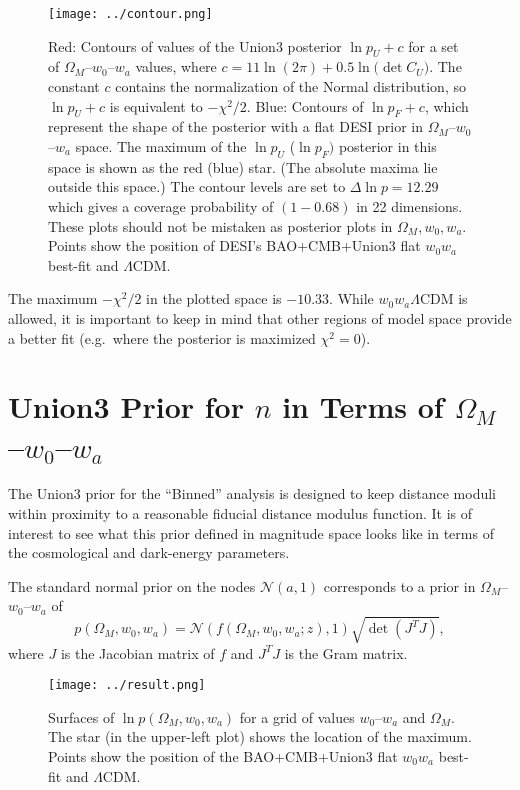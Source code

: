 \documentclass[11pt,a4paper]{article}
\begin{document}
\begin{figure}[htbp] %
   \centering
   \texttt{[image: ../contour.png]} 
   \caption{Red: Contours of values of the Union3 posterior $\ln{p_U}+c$ for a
set of $\Omega_M$--$w_0$--$w_a$ values, where $c= 11\ln{(2\pi)} + 0.5\ln({\det{C_U})}$.  The constant $c$ contains the
normalization of the Normal distribution, so $\ln{p_U}+c$  is equivalent to  $-\chi^2/2$.   
   Blue: Contours of  $\ln{p_F}  +c  $, which represent the shape of the posterior with a flat DESI prior in  $\Omega_M$--$w_0$--$w_a$ space.   
   The maximum of the $\ln{p}_U$  ($\ln{p}_F)$ posterior in this space is shown as the red (blue) star.  (The absolute maxima
   lie outside this space.)
   The contour levels are set to $\Delta \ln{p}=12.29$ which gives
   a coverage probability of $(1-0.68)$ in 22 dimensions. 
   These plots should not be mistaken as posterior plots in  $\Omega_M, w_0, w_a$. 
   Points show the position of DESI's  BAO+CMB+Union3 flat $w_0w_a$ best-fit 
    and  $\Lambda$CDM.}
   \label{fig:posterior}
\end{figure}

The maximum $-\chi^2/2$ in the plotted space is $-10.33$.  While $w_0w_a\Lambda$CDM is allowed, it is important
to keep in mind that other regions of model space provide a better fit (e.g.\ where the posterior is maximized $\chi^2=0$). 

\section{Union3 Prior for $n$ in Terms of $\Omega_M$--$w_0$--$w_a$}
The Union3 prior for the ``Binned'' analysis is designed to keep distance moduli within  proximity to a reasonable
fiducial distance modulus function.  It is of interest to see what this prior defined in magnitude
space looks like in terms of the cosmological and dark-energy parameters.

The standard normal prior on the nodes $\mathcal{N}(a,1)$ corresponds to a prior in  $\Omega_M$--$w_0$--$w_a$ of
\begin{equation}
p(\Omega_M, w_0,w_a) = \mathcal{N}(f(\Omega_M, w_0, w_a; z),1)  \sqrt{\det{\left(J^T J\right)}},
\end{equation}
where $J$ is the Jacobian matrix of $f$ and $J^TJ$ is the Gram matrix.

\begin{figure}[htbp] %
   \centering
   \texttt{[image: ../result.png]} 
   \caption{Surfaces of $\ln{p}(\Omega_M, w_0,w_a)$  for a grid of values
 $w_0$--$w_a$ and $\Omega_M$.    The star (in the upper-left plot) shows the location of the maximum.
   Points show the position of the BAO+CMB+Union3 flat $w_0w_a$ best-fit     and  $\Lambda$CDM.}
   \label{fig:priors}
\end{figure}
\end{document}
